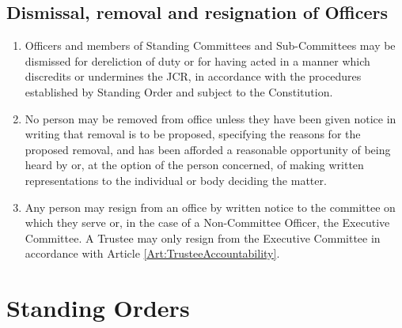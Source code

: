 \documentclass[11pt,a4paper, oneside]{memoir}
\begin{document}
	\section{Dismissal, removal and resignation of Officers}
	\label{Art:Dismissal}
	\begin{enumerate}
		\item Officers and members of Standing Committees and Sub-Committees may be dismissed for dereliction of duty or for having acted in a manner which discredits or undermines the JCR, in accordance with the procedures established by Standing Order and subject to the Constitution.
		\item No person may be removed from office unless they have been given notice in writing that removal is to be proposed, specifying the reasons for the proposed removal, and has been afforded a reasonable opportunity of being heard by or, at the option of the person concerned, of making written representations to the individual or body deciding the matter.
		\item Any person may resign from an office by written notice to the committee on which they serve or, in the case of a Non-Committee Officer, the Executive Committee.
		A Trustee may only resign from the Executive Committee in accordance with Article \ref{Art:TrusteeAccountability}.
	\end{enumerate}
	\chapter{Standing Orders}
\end{document}
